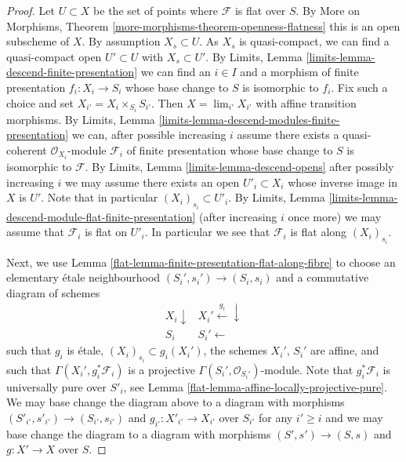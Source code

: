 \begin{proof}

Let $U \subset X$ be the set of points where $\mathcal{F}$ is
flat over $S$. By
More on Morphisms, Theorem \ref{more-morphisms-theorem-openness-flatness}
this is an open subscheme of $X$. By assumption $X_s \subset U$.
As $X_s$ is quasi-compact, we can find a quasi-compact open
$U' \subset U$ with $X_s \subset U'$. By
Limits, Lemma \ref{limits-lemma-descend-finite-presentation}
we can find an $i \in I$ and a morphism of finite presentation
$f_i : X_i \to S_i$ whose base change to $S$ is isomorphic to $f_i$.
Fix such a choice and set $X_{i'} = X_i \times_{S_i} S_{i'}$.
Then $X = \lim_{i'} X_{i'}$ with affine transition morphisms. By
Limits, Lemma \ref{limits-lemma-descend-modules-finite-presentation}
we can, after possible increasing $i$ assume there exists a
quasi-coherent $\mathcal{O}_{X_i}$-module $\mathcal{F}_i$
of finite presentation whose base change to $S$ is isomorphic to
$\mathcal{F}$. By
Limits, Lemma \ref{limits-lemma-descend-opens}
after possibly increasing $i$ we may assume there exists an
open $U'_i \subset X_i$ whose inverse image in $X$ is $U'$.
Note that in particular $(X_i)_{s_i} \subset U'_i$. By
Limits, Lemma \ref{limits-lemma-descend-module-flat-finite-presentation}
(after increasing $i$ once more)
we may assume that $\mathcal{F}_i$ is flat on $U'_i$.
In particular we see that $\mathcal{F}_i$ is flat along $(X_i)_{s_i}$.

\medskip\noindent
Next, we use
Lemma \ref{flat-lemma-finite-presentation-flat-along-fibre}
to choose an elementary \'etale neighbourhood
$(S_i', s_i') \to (S_i, s_i)$ and a commutative diagram of schemes
$$
\begin{array}{cc}X_i \downarrow & X_i' \overset{g_i}{\longleftarrow}\downarrow \\ S_i & S_i' \longleftarrow\end{array}
$$
such that $g_i$ is \'etale, $(X_i)_{s_i} \subset g_i(X_i')$, the schemes
$X_i'$, $S_i'$ are affine, and such that
$\Gamma(X_i', g_i^*\mathcal{F}_i)$ is a projective
$\Gamma(S_i', \mathcal{O}_{S_i'})$-module.
Note that $g_i^*\mathcal{F}_i$ is universally pure over $S'_i$, see
Lemma \ref{flat-lemma-affine-locally-projective-pure}.
We may base change the diagram above to a diagram with morphisms
$(S'_{i'}, s'_{i'}) \to (S_{i'}, s_{i'})$ and
$g_{i'} : X'_{i'} \to X_{i'}$ over $S_{i'}$
for any $i' \geq i$ and we may base change the diagram to a diagram
with morphisms $(S', s') \to (S, s)$ and $g : X' \to X$ over $S$.


\end{proof}
